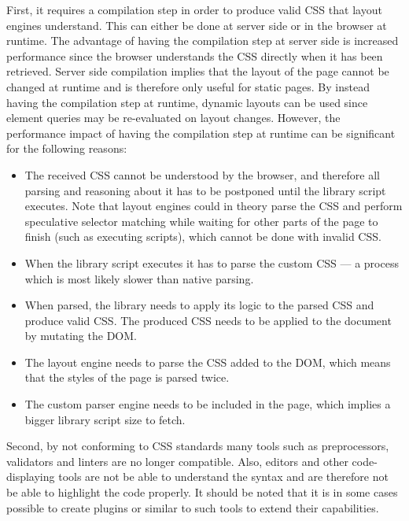 \documentclass[a4paper,11pt]{kth-mag}
\begin{document}
    First, it requires a compilation step in order to produce valid \gls{CSS} that \glspl{layout engine} understand.
    This can either be done at server side or in the \gls{browser} at runtime.
    The advantage of having the compilation step at server side is increased performance since the \gls{browser} understands the \gls{CSS} directly when it has been retrieved.
    Server side compilation implies that the layout of the page cannot be changed at runtime and is therefore only useful for static pages.
    By instead having the compilation step at runtime, dynamic layouts can be used since element queries may be re-evaluated on layout changes.
    However, the performance impact of having the compilation step at runtime can be significant for the following reasons:
    \begin{itemize}
      \item The received \gls{CSS} cannot be understood by the \gls{browser}, and therefore all parsing and reasoning about it has to be postponed until the library script executes.
      Note that \glspl{layout engine} could in theory parse the \gls{CSS} and perform speculative selector matching while waiting for other parts of the page to finish (such as executing scripts), which cannot be done with invalid \gls{CSS}.
      \item When the library script executes it has to parse the custom \gls{CSS} --- a process which is most likely slower than \gls{native} parsing.
      \item When parsed, the library needs to apply its logic to the parsed \gls{CSS} and produce valid \gls{CSS}. The produced \gls{CSS} needs to be applied to the \gls{document} by mutating the \gls{DOM}.
      \item The \gls{layout engine} needs to parse the \gls{CSS} added to the \gls{DOM}, which means that the styles of the page is parsed twice.
      \item The custom parser engine needs to be included in the page, which implies a bigger library script size to fetch.
    \end{itemize}
    
    Second, by not conforming to \gls{CSS} standards many tools such as preprocessors, validators and linters are no longer compatible.
    Also, editors and other code-displaying tools are not be able to understand the syntax and are therefore not be able to highlight the code properly.
    It should be noted that it is in some cases possible to create plugins or similar to such tools to extend their capabilities.
\end{document}
